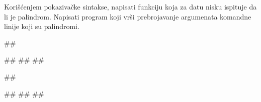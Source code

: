 \begin{Exercise}[label=2_05]
Korišćenjem pokazivačke sintakse, napisati funkciju koja
za datu nisku ispituje da li je palindrom. Napisati program koji
vrši prebrojavanje argumenata komandne linije koji su
palindromi.

\begin{miditest}
\begin{upotreba}{1}
##

#\naslovInt#
##
##
\end{upotreba}
\end{miditest}
\begin{miditest}
\begin{upotreba}{2}
##

#\naslovInt#
##
##
\end{upotreba}
\end{miditest}

\end{Exercise}
\begin{Answer}[ref=2_05]
\end{Answer}

